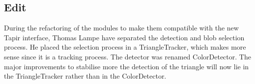 \subsection{Edit}

During the refactoring of the modules to make them compatible with the 
new Tapir interface, Thomas Lampe have separated the detection and blob 
selection process. He placed the selection process in a TriangleTracker, 
which makes more sense since it is a tracking process. The detector was 
renamed ColorDetector. The major improvements to stabilise more the 
detection of the triangle will now lie in the TriangleTracker rather 
than in the ColorDetector.
